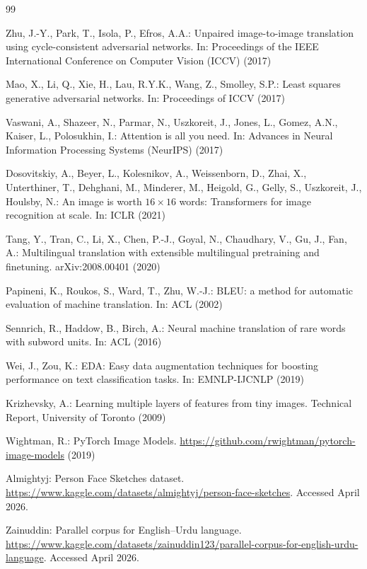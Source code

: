 \documentclass[runningheads]{llncs}
\begin{document}
\begin{thebibliography}{99}

Zhu, J.-Y., Park, T., Isola, P., Efros, A.A.: Unpaired image-to-image
translation using cycle-consistent adversarial networks. In:
Proceedings of the IEEE International Conference on Computer Vision
(ICCV) (2017)

Mao, X., Li, Q., Xie, H., Lau, R.Y.K., Wang, Z., Smolley, S.P.: Least
squares generative adversarial networks. In: Proceedings of ICCV (2017)

Vaswani, A., Shazeer, N., Parmar, N., Uszkoreit, J., Jones, L., Gomez,
A.N., Kaiser, L., Polosukhin, I.: Attention is all you need. In:
Advances in Neural Information Processing Systems (NeurIPS) (2017)

Dosovitskiy, A., Beyer, L., Kolesnikov, A., Weissenborn, D., Zhai, X.,
Unterthiner, T., Dehghani, M., Minderer, M., Heigold, G., Gelly, S.,
Uszkoreit, J., Houlsby, N.: An image is worth $16\!\times\!16$ words:
Transformers for image recognition at scale. In: ICLR (2021)

Tang, Y., Tran, C., Li, X., Chen, P.-J., Goyal, N., Chaudhary, V., Gu,
J., Fan, A.: Multilingual translation with extensible multilingual
pretraining and finetuning. arXiv:2008.00401 (2020)

Papineni, K., Roukos, S., Ward, T., Zhu, W.-J.: BLEU: a method for
automatic evaluation of machine translation. In: ACL (2002)

Sennrich, R., Haddow, B., Birch, A.: Neural machine translation of
rare words with subword units. In: ACL (2016)

Wei, J., Zou, K.: EDA: Easy data augmentation techniques for boosting
performance on text classification tasks. In: EMNLP-IJCNLP (2019)

Krizhevsky, A.: Learning multiple layers of features from tiny images.
Technical Report, University of Toronto (2009)

Wightman, R.: PyTorch Image Models.
\url{https://github.com/rwightman/pytorch-image-models} (2019)

Almightyj: Person Face Sketches dataset.
\url{https://www.kaggle.com/datasets/almightyj/person-face-sketches}.
Accessed April 2026.

Zainuddin: Parallel corpus for English--Urdu language.
\url{https://www.kaggle.com/datasets/zainuddin123/parallel-corpus-for-english-urdu-language}.
Accessed April 2026.

\end{thebibliography}
\end{document}
